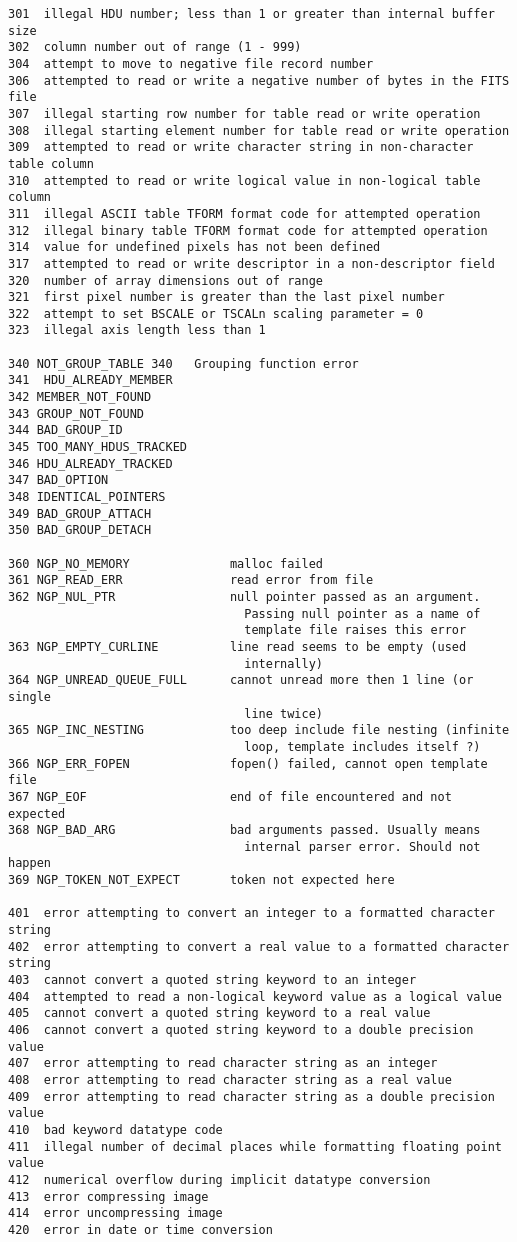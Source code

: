 \documentclass[11pt]{book}
\begin{document}
\begin{verbatim}
301  illegal HDU number; less than 1 or greater than internal buffer size
302  column number out of range (1 - 999)
304  attempt to move to negative file record number
306  attempted to read or write a negative number of bytes in the FITS file
307  illegal starting row number for table read or write operation
308  illegal starting element number for table read or write operation
309  attempted to read or write character string in non-character table column
310  attempted to read or write logical value in non-logical table column
311  illegal ASCII table TFORM format code for attempted operation
312  illegal binary table TFORM format code for attempted operation
314  value for undefined pixels has not been defined
317  attempted to read or write descriptor in a non-descriptor field
320  number of array dimensions out of range
321  first pixel number is greater than the last pixel number
322  attempt to set BSCALE or TSCALn scaling parameter = 0
323  illegal axis length less than 1

340 NOT_GROUP_TABLE 340   Grouping function error
341  HDU_ALREADY_MEMBER
342 MEMBER_NOT_FOUND
343 GROUP_NOT_FOUND
344 BAD_GROUP_ID
345 TOO_MANY_HDUS_TRACKED
346 HDU_ALREADY_TRACKED
347 BAD_OPTION
348 IDENTICAL_POINTERS
349 BAD_GROUP_ATTACH
350 BAD_GROUP_DETACH

360 NGP_NO_MEMORY              malloc failed
361 NGP_READ_ERR               read error from file
362 NGP_NUL_PTR                null pointer passed as an argument.
                                 Passing null pointer as a name of
                                 template file raises this error
363 NGP_EMPTY_CURLINE          line read seems to be empty (used
                                 internally)
364 NGP_UNREAD_QUEUE_FULL      cannot unread more then 1 line (or single
                                 line twice)
365 NGP_INC_NESTING            too deep include file nesting (infinite
                                 loop, template includes itself ?)
366 NGP_ERR_FOPEN              fopen() failed, cannot open template file
367 NGP_EOF                    end of file encountered and not expected
368 NGP_BAD_ARG                bad arguments passed. Usually means
                                 internal parser error. Should not happen
369 NGP_TOKEN_NOT_EXPECT       token not expected here

401  error attempting to convert an integer to a formatted character string
402  error attempting to convert a real value to a formatted character string
403  cannot convert a quoted string keyword to an integer
404  attempted to read a non-logical keyword value as a logical value
405  cannot convert a quoted string keyword to a real value
406  cannot convert a quoted string keyword to a double precision value
407  error attempting to read character string as an integer
408  error attempting to read character string as a real value
409  error attempting to read character string as a double precision value
410  bad keyword datatype code
411  illegal number of decimal places while formatting floating point value
412  numerical overflow during implicit datatype conversion
413  error compressing image
414  error uncompressing image
420  error in date or time conversion


\end{verbatim}
\end{document}
